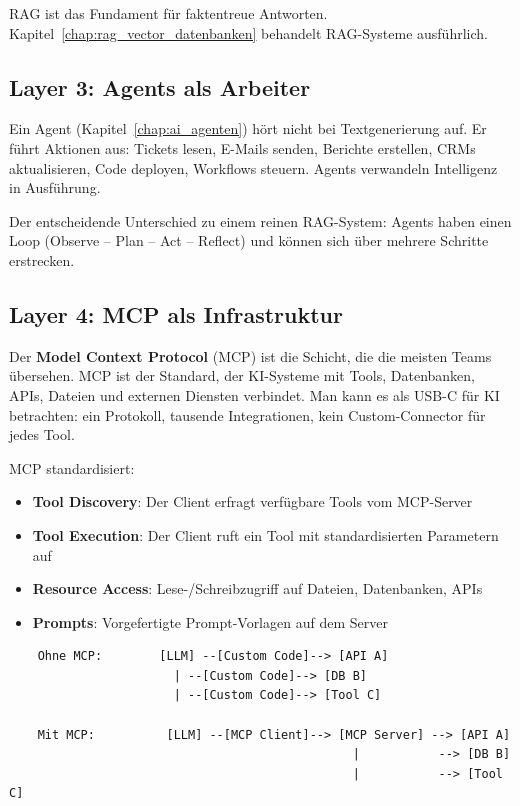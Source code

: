 RAG ist das Fundament für faktentreue Antworten. Kapitel~\ref{chap:rag_vector_datenbanken} behandelt RAG-Systeme ausführlich.

\subsection{Layer 3: Agents als Arbeiter}

Ein Agent (Kapitel~\ref{chap:ai_agenten}) hört nicht bei Textgenerierung auf. Er führt Aktionen aus: Tickets lesen, E-Mails senden, Berichte erstellen, CRMs aktualisieren, Code deployen, Workflows steuern. Agents verwandeln Intelligenz in Ausführung.

Der entscheidende Unterschied zu einem reinen RAG-System: Agents haben einen Loop (Observe -- Plan -- Act -- Reflect) und können sich über mehrere Schritte erstrecken.

\subsection{Layer 4: MCP als Infrastruktur}

Der \textbf{Model Context Protocol} (MCP) ist die Schicht, die die meisten Teams übersehen. MCP ist der Standard, der KI-Systeme mit Tools, Datenbanken, APIs, Dateien und externen Diensten verbindet. Man kann es als USB-C für KI betrachten: ein Protokoll, tausende Integrationen, kein Custom-Connector für jedes Tool.

MCP standardisiert:
\begin{itemize}[leftmargin=*]
    \item \textbf{Tool Discovery}: Der Client erfragt verfügbare Tools vom MCP-Server
    \item \textbf{Tool Execution}: Der Client ruft ein Tool mit standardisierten Parametern auf
    \item \textbf{Resource Access}: Lese-/Schreibzugriff auf Dateien, Datenbanken, APIs
    \item \textbf{Prompts}: Vorgefertigte Prompt-Vorlagen auf dem Server
\end{itemize}

\begin{verbatim}
    Ohne MCP:        [LLM] --[Custom Code]--> [API A]
                       | --[Custom Code]--> [DB B]
                       | --[Custom Code]--> [Tool C]
                       
    Mit MCP:          [LLM] --[MCP Client]--> [MCP Server] --> [API A]
                                                |           --> [DB B]
                                                |           --> [Tool C]
\end{verbatim}

